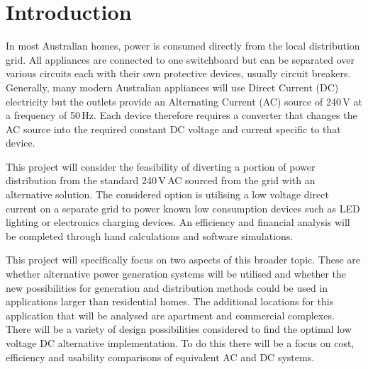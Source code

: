 
\section{Introduction}

In most Australian homes, power is consumed directly from the local distribution grid. All appliances are connected to one switchboard but can be separated over various circuits each with their own protective devices, usually circuit breakers. Generally, many modern Australian appliances will use Direct Current (DC) electricity but the outlets provide an Alternating Current (AC) source of 240\,V at a frequency of 50\,Hz. Each device therefore requires a converter that changes the AC source into the required constant DC voltage and current specific to that device. 
\newline

This project will consider the feasibility of diverting a portion of power distribution from the standard 240\,V\,AC sourced from the grid with an alternative solution. The considered option is utilising a low voltage direct current on a separate grid to power known low consumption devices such as LED lighting or electronics charging devices. An efficiency and financial analysis will be completed through hand calculations and software simulations.  
\newline

This project will specifically focus on two aspects of this broader topic. These are whether alternative power generation systems will be utilised and whether the new possibilities for generation and distribution methods could be used in applications larger than residential homes. The additional locations for this application that will be analysed are apartment and commercial complexes. There will be a variety of design possibilities considered to find the optimal low voltage DC alternative implementation. To do this there will be a focus on cost, efficiency and usability comparisons of equivalent AC and DC systems.   

\newpage